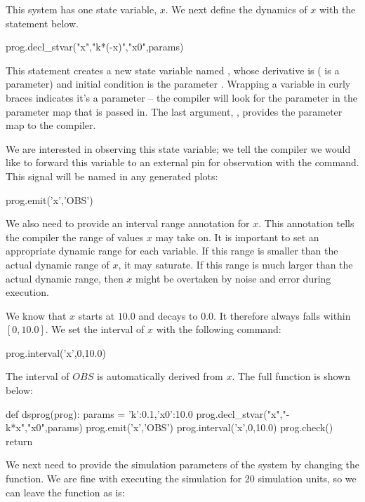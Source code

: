 This system has one state variable, $x$. We next define the dynamics of $x$ with
the statement below.


\begin{dssnippet}
  prog.decl_stvar("x","{k}*(-x)","{x0}",params)
\end{dssnippet}

This statement creates a new state variable named , whose derivative is
 ( is a parameter) and initial condition is the
parameter . Wrapping a variable in curly braces indicates it's a
parameter -- the compiler will look for the parameter in the parameter map
that is passed in. The last argument, , provides the parameter map to
the compiler. 

We are interested in observing this state variable; we tell the compiler we
would like to forward this variable to an external pin for observation with the
 command. This signal will be named  in any generated plots:

\begin{dssnippet}
  prog.emit('x','OBS')
\end{dssnippet}

We also need to provide an interval range annotation for $x$. This annotation
tells the compiler the range of values $x$ may take on. It is important to set
an appropriate dynamic range for each variable. If this range is smaller
than the actual dynamic range of $x$, it may saturate. If this range is much
larger than the actual dynamic range, then $x$ might be overtaken by noise and
error during execution.

We know that $x$ starts at $10.0$ and decays to $0.0$. It therefore always falls
within $[0,10.0]$. We set the interval of $x$ with the following command:

\begin{dssnippet}
  prog.interval('x',0,10.0)
\end{dssnippet}

The interval of $OBS$ is automatically derived from $x$. The full 
function is shown below:

\begin{dssnippet}
def dsprog(prog):
  params = {'k':0.1,'x0':10.0}
  prog.decl_stvar("x","-{k}*x","{x0}",params)
  prog.emit('x','OBS')
  prog.interval('x',0,10.0)
  prog.check()
  return
\end{dssnippet}

We next need to provide the simulation parameters of the system by changing the
 function. We are fine with executing the simulation for 20 simulation
units, so we can leave the  function as is:

